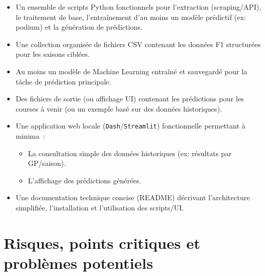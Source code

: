 \documentclass[11pt, a4paper]{article}
\begin{document}
\begin{itemize}[label=\textbullet, itemsep=0.2em, leftmargin=*]
    \item Un ensemble de scripts Python fonctionnels pour l'extraction (scraping/API), le traitement de base, l'entraînement d'au moins un modèle prédictif (ex: podium) et la génération de prédictions.
    \item Une collection organisée de fichiers CSV contenant les données F1 structurées pour les saisons ciblées.
    \item Au moins un modèle de Machine Learning entraîné et sauvegardé pour la tâche de prédiction principale.
    \item Des fichiers de sortie (ou affichage UI) contenant les prédictions pour les courses à venir (ou un exemple basé sur des données historiques).
    \item Une application web locale (\texttt{Dash}/\texttt{Streamlit}) fonctionnelle permettant à minima~:
        \begin{itemize}[label=\textendash, itemsep=0.2em, leftmargin=*]
            \item La consultation simple des données historiques (ex: résultats par GP/saison).
            \item L'affichage des prédictions générées.
        \end{itemize}
    \item Une documentation technique concise (README) décrivant l'architecture simplifiée, l'installation et l'utilisation des scripts/UI.
\end{itemize}

\section{Risques, points critiques et problèmes potentiels}
\end{document}
